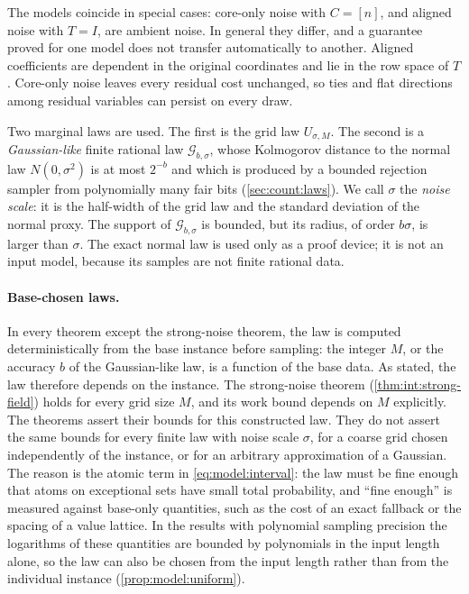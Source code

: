 The models coincide in special cases: core-only noise with $C=[n]$, and
aligned noise with $T=I$, are ambient noise. In general they differ, and a
guarantee proved for one model does not transfer automatically to another.
Aligned coefficients are dependent in the original coordinates and lie in
the row space of $T$. Core-only noise leaves every residual cost unchanged,
so ties and flat directions among residual variables can persist on every
draw.

Two marginal laws are used. The first is the grid law $U_{\sigma,M}$. The
second is a \emph{Gaussian-like} finite rational law $\mathcal G_{b,\sigma}$,
whose Kolmogorov distance to the normal law $N(0,\sigma^2)$ is at most
$2^{-b}$ and which is produced by a bounded rejection sampler from
polynomially many fair bits (\cref{sec:count:laws}). We call $\sigma$ the
\emph{noise scale}: it is the half-width of the grid law and the standard
deviation of the normal proxy. The support of $\mathcal G_{b,\sigma}$ is
bounded, but its radius, of order $b\sigma$, is larger than $\sigma$. The
exact normal law is used only as a proof device; it is not an input model,
because its samples are not finite rational data.

\paragraph{Base-chosen laws.}
In every theorem except the strong-noise theorem, the law is computed
deterministically from the base instance before sampling: the integer $M$,
or the accuracy $b$ of the Gaussian-like law, is a function of the base data.
As stated, the law therefore depends on the instance. The strong-noise theorem
(\cref{thm:int:strong-field}) holds for every grid size $M$, and its work
bound depends on $M$ explicitly. The theorems assert their bounds for this
constructed law. They do not assert the same bounds for every finite law
with noise scale $\sigma$, for a coarse grid chosen independently of the
instance, or for an arbitrary approximation of a Gaussian. The reason is the
atomic term in \eqref{eq:model:interval}: the law must be fine enough that
atoms on exceptional sets have small total probability, and ``fine enough''
is measured against base-only quantities, such as the cost of an exact
fallback or the spacing of a value lattice. In the results with polynomial
sampling precision the logarithms of these quantities are bounded by
polynomials in the input length alone, so the law can also be chosen from
the input length rather than from the individual instance
(\cref{prop:model:uniform}).

